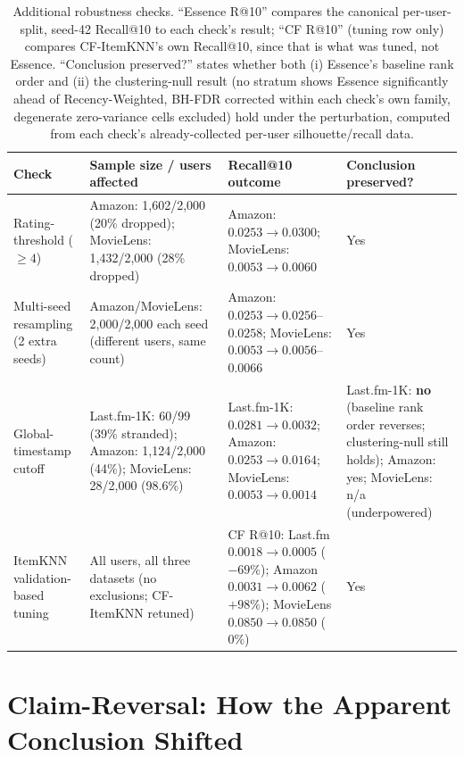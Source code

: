 \documentclass{article}
\begin{document}
\begin{table}[H]
\centering
\caption{Additional robustness checks. ``Essence R@10'' compares the canonical per-user-split, seed-42 Recall@10 to each check's result; ``CF R@10'' (tuning row only) compares CF-ItemKNN's own Recall@10, since that is what was tuned, not Essence. ``Conclusion preserved?'' states whether both (i) Essence's baseline rank order and (ii) the clustering-null result (no stratum shows Essence significantly ahead of Recency-Weighted, BH-FDR corrected within each check's own family, degenerate zero-variance cells excluded) hold under the perturbation, computed from each check's already-collected per-user silhouette/recall data.}
\label{tab:robustness}
\small
\begin{tabular}{@{}p{}p{}p{}p{}@{}}
\toprule
\textbf{Check} & \textbf{Sample size / users affected} & \textbf{Recall@10 outcome} & \textbf{Conclusion preserved?} \\
\midrule
Rating-threshold ($\geq 4$) & Amazon: 1{,}602/2{,}000 (20\% dropped); MovieLens: 1{,}432/2{,}000 (28\% dropped) & Amazon: $0.0253\to0.0300$; MovieLens: $0.0053\to0.0060$ & Yes \\
\addlinespace
Multi-seed resampling (2 extra seeds) & Amazon/MovieLens: 2{,}000/2{,}000 each seed (different users, same count) & Amazon: $0.0253\to0.0256$--$0.0258$; MovieLens: $0.0053\to0.0056$--$0.0066$ & Yes \\
\addlinespace
Global-timestamp cutoff & Last.fm-1K: 60/99 (39\% stranded); Amazon: 1{,}124/2{,}000 (44\%); MovieLens: 28/2{,}000 (98.6\%) & Last.fm-1K: $0.0281\to0.0032$; Amazon: $0.0253\to0.0164$; MovieLens: $0.0053\to0.0014$ & Last.fm-1K: \textbf{no} (baseline rank order reverses; clustering-null still holds); Amazon: yes; MovieLens: n/a (underpowered) \\
\addlinespace
ItemKNN validation-based tuning & All users, all three datasets (no exclusions; CF-ItemKNN retuned) & CF R@10: Last.fm $0.0018\to0.0005$ ($-69\%$); Amazon $0.0031\to0.0062$ ($+98\%$); MovieLens $0.0850\to0.0850$ ($0\%$) & Yes \\
\bottomrule
\end{tabular}
\end{table}

\section{Claim-Reversal: How the Apparent Conclusion Shifted}
\label{app:claimreversal}
\end{document}
